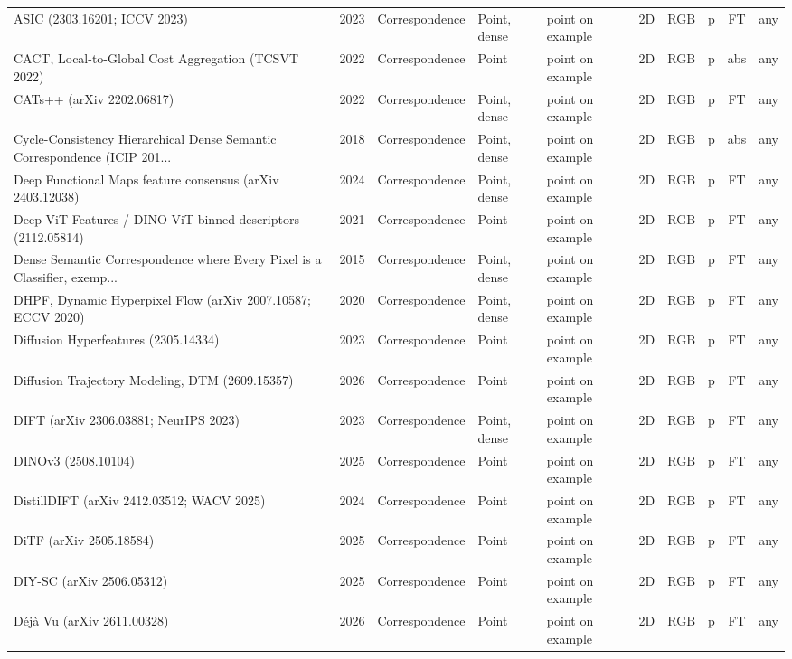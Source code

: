{\begin{landscape}
\begin{longtable}{@{}p{4.6cm}rp{2.0cm}lllllcl@{}}
ASIC (2303.16201; ICCV 2023) & 2023 & Correspondence & Point, dense & point on example & 2D & RGB & p & FT & any \\
CACT, Local-to-Global Cost Aggregation (TCSVT 2022) & 2022 & Correspondence & Point & point on example & 2D & RGB & p & abs & any \\
CATs++ (arXiv 2202.06817) & 2022 & Correspondence & Point, dense & point on example & 2D & RGB & p & FT & any \\
Cycle-Consistency Hierarchical Dense Semantic Correspondence (ICIP 201... & 2018 & Correspondence & Point, dense & point on example & 2D & RGB & p & abs & any \\
Deep Functional Maps feature consensus (arXiv 2403.12038) & 2024 & Correspondence & Point, dense & point on example & 2D & RGB & p & FT & any \\
Deep ViT Features / DINO-ViT binned descriptors (2112.05814) & 2021 & Correspondence & Point & point on example & 2D & RGB & p & FT & any \\
Dense Semantic Correspondence where Every Pixel is a Classifier, exemp... & 2015 & Correspondence & Point, dense & point on example & 2D & RGB & p & FT & any \\
DHPF, Dynamic Hyperpixel Flow (arXiv 2007.10587; ECCV 2020) & 2020 & Correspondence & Point, dense & point on example & 2D & RGB & p & FT & any \\
Diffusion Hyperfeatures (2305.14334) & 2023 & Correspondence & Point & point on example & 2D & RGB & p & FT & any \\
Diffusion Trajectory Modeling, DTM (2609.15357) & 2026 & Correspondence & Point & point on example & 2D & RGB & p & FT & any \\
DIFT (arXiv 2306.03881; NeurIPS 2023) & 2023 & Correspondence & Point, dense & point on example & 2D & RGB & p & FT & any \\
DINOv3 (2508.10104) & 2025 & Correspondence & Point & point on example & 2D & RGB & p & FT & any \\
DistillDIFT (arXiv 2412.03512; WACV 2025) & 2024 & Correspondence & Point & point on example & 2D & RGB & p & FT & any \\
DiTF (arXiv 2505.18584) & 2025 & Correspondence & Point & point on example & 2D & RGB & p & FT & any \\
DIY-SC (arXiv 2506.05312) & 2025 & Correspondence & Point & point on example & 2D & RGB & p & FT & any \\
Déjà Vu (arXiv 2611.00328) & 2026 & Correspondence & Point & point on example & 2D & RGB & p & FT & any \\

\end{longtable}
\end{landscape}}
